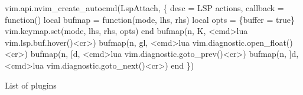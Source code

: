 \documentclass[
  letterpaper,
  DIV=11,
  numbers=noendperiod,
  oneside]{scrartcl}
\newenvironment{Shaded}{\begin{snugshade}}{\end{snugshade}}
\newcommand{\BuiltInTok}[1]{\textcolor[rgb]{0.00,0.23,0.31}{#1}}
\newcommand{\ErrorTok}[1]{\textcolor[rgb]{0.68,0.00,0.00}{#1}}
\newcommand{\ExtensionTok}[1]{\textcolor[rgb]{0.00,0.23,0.31}{#1}}
\newcommand{\KeywordTok}[1]{\textcolor[rgb]{0.00,0.23,0.31}{#1}}
\newcommand{\NormalTok}[1]{\textcolor[rgb]{0.00,0.23,0.31}{#1}}
\newcommand{\OperatorTok}[1]{\textcolor[rgb]{0.37,0.37,0.37}{#1}}
\newcommand{\StringTok}[1]{\textcolor[rgb]{0.13,0.47,0.30}{#1}}
\newcommand{\VariableTok}[1]{\textcolor[rgb]{0.07,0.07,0.07}{#1}}
\begin{document}
\begin{Shaded}
\begin{Highlighting}[]
\ExtensionTok{vim.api.nvim\_create\_autocmd}\ErrorTok{(}\StringTok{\textquotesingle{}LspAttach\textquotesingle{}}\ExtensionTok{,}\NormalTok{ \{}
  \ExtensionTok{desc}\NormalTok{ = }\StringTok{\textquotesingle{}LSP actions\textquotesingle{}}\NormalTok{,}
  \ExtensionTok{callback}\NormalTok{ = function}\ErrorTok{(}\KeywordTok{)}
    \BuiltInTok{local} \VariableTok{bufmap} \OperatorTok{=} \VariableTok{function(}\NormalTok{mode, lhs, rhs}\VariableTok{)}
      \BuiltInTok{local} \VariableTok{opts} \OperatorTok{=}\NormalTok{ \{buffer }\OperatorTok{=} \VariableTok{true}\NormalTok{\}}
      \ExtensionTok{vim.keymap.set}\ErrorTok{(}\ExtensionTok{mode,}\NormalTok{ lhs, rhs, opts}\KeywordTok{)}
    \ExtensionTok{end}
    \ExtensionTok{bufmap}\ErrorTok{(}\StringTok{\textquotesingle{}n\textquotesingle{}}\ExtensionTok{,} \StringTok{\textquotesingle{}K\textquotesingle{}}\NormalTok{, }\StringTok{\textquotesingle{}\textless{}cmd\textgreater{}lua vim.lsp.buf.hover()\textless{}cr\textgreater{}\textquotesingle{}}\KeywordTok{)}
    \ExtensionTok{bufmap}\ErrorTok{(}\StringTok{\textquotesingle{}n\textquotesingle{}}\ExtensionTok{,} \StringTok{\textquotesingle{}gl\textquotesingle{}}\NormalTok{, }\StringTok{\textquotesingle{}\textless{}cmd\textgreater{}lua vim.diagnostic.open\_float()\textless{}cr\textgreater{}\textquotesingle{}}\KeywordTok{)}
    \ExtensionTok{bufmap}\ErrorTok{(}\StringTok{\textquotesingle{}n\textquotesingle{}}\ExtensionTok{,} \StringTok{\textquotesingle{}[d\textquotesingle{}}\NormalTok{, }\StringTok{\textquotesingle{}\textless{}cmd\textgreater{}lua vim.diagnostic.goto\_prev()\textless{}cr\textgreater{}\textquotesingle{}}\KeywordTok{)}
    \ExtensionTok{bufmap}\ErrorTok{(}\StringTok{\textquotesingle{}n\textquotesingle{}}\ExtensionTok{,} \StringTok{\textquotesingle{}]d\textquotesingle{}}\NormalTok{, }\StringTok{\textquotesingle{}\textless{}cmd\textgreater{}lua vim.diagnostic.goto\_next()\textless{}cr\textgreater{}\textquotesingle{}}\KeywordTok{)}
  \ExtensionTok{end}
\ErrorTok{\}}\KeywordTok{)}
\end{Highlighting}
\end{Shaded}

List of plugins
\end{document}
